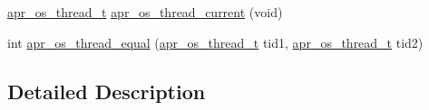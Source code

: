\begin{DoxyCompactItemize}
$$\item 
\hyperlink{group__apr__portabile_ga4ccd9519af148ccf9cff850dd58f00b6}{apr\-\_\-os\-\_\-thread\-\_\-t} \hyperlink{group__apr__os__thread_ga669a17c3a41db20bbc41c06d0e8881b3}{apr\-\_\-os\-\_\-thread\-\_\-current} (void)
\item 
int \hyperlink{group__apr__os__thread_gac55d4bbc219435046872b1236feb9bfa}{apr\-\_\-os\-\_\-thread\-\_\-equal} (\hyperlink{group__apr__portabile_ga4ccd9519af148ccf9cff850dd58f00b6}{apr\-\_\-os\-\_\-thread\-\_\-t} tid1, \hyperlink{group__apr__portabile_ga4ccd9519af148ccf9cff850dd58f00b6}{apr\-\_\-os\-\_\-thread\-\_\-t} tid2)
\end{DoxyCompactItemize}


\subsection{Detailed Description}


